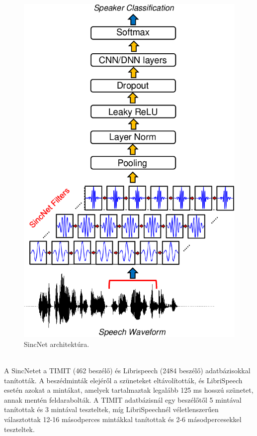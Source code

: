 \begin{figure}[!ht]
	\centering
	\includegraphics[width=120mm, keepaspectratio]{figures/sincnet-nn.png}
	\caption{SincNet architektúra.}
	\label{fig:sincnet-nn}
\end{figure}
\ \\
\newline
\newline
A SincNetet a TIMIT (462 beszélő) és Librispeech (2484 beszélő) adatbázisokkal tanították.
A beszédminták elejéről a szüneteket eltávolították, és LibriSpeech esetén azokat a mintákat, amelyek tartalmaztak legalább 125 ms hosszú szünetet, annak mentén feldarabolták. A TIMIT adatbázisnál egy beszélőtől 5 mintával tanítottak és 3 mintával teszteltek, míg LibriSpeechnél véletlenszerűen választottak 12-16 másodperces mintákkal tanítottak és 2-6 másodpercesekkel teszteltek.
\newline
